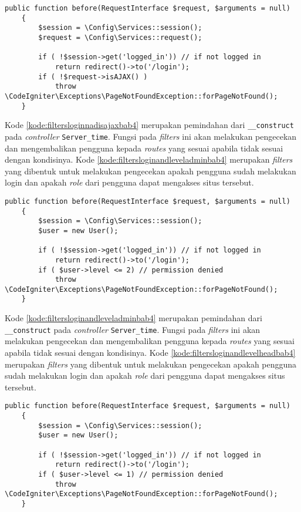 \begin{lstlisting}[caption=Pemindahan kode pada \textit{Filters}, label=kode:filtersloginnadisajaxbab4]
	public function before(RequestInterface $request, $arguments = null)
    {   
        $session = \Config\Services::session();
        $request = \Config\Services::request();

		if ( !$session->get('logged_in')) // if not logged in
			return redirect()->to('/login');
        if ( !$request->isAJAX() )
			throw \CodeIgniter\Exceptions\PageNotFoundException::forPageNotFound();
    }
\end{lstlisting}

Kode \ref{kode:filtersloginnadisajaxbab4} merupakan pemindahan dari \texttt{\_\_construct} pada \textit{controller}  \texttt{Server\_time}. Fungsi pada \textit{filters} ini akan melakukan pengecekan dan mengembalikan pengguna kepada \textit{routes} yang sesuai apabila tidak sesuai dengan kondisinya. Kode \ref{kode:filtersloginandleveladminbab4} merupakan \textit{filters} yang dibentuk untuk melakukan pengecekan apakah pengguna sudah melakukan login dan apakah \textit{role} dari pengguna dapat mengakses situs tersebut.

\begin{lstlisting}[caption=Pemindahan kode pada \textit{Filters}, label=kode:filtersloginandleveladminbab4]
	public function before(RequestInterface $request, $arguments = null)
    {   
        $session = \Config\Services::session();
        $user = new User();

		if ( !$session->get('logged_in')) // if not logged in
			return redirect()->to('/login');
        if ( $user->level <= 2) // permission denied
			throw \CodeIgniter\Exceptions\PageNotFoundException::forPageNotFound();	
    }
\end{lstlisting}

Kode \ref{kode:filtersloginandleveladminbab4} merupakan pemindahan dari \texttt{\_\_construct} pada \textit{controller}  \texttt{Server\_time}. Fungsi pada \textit{filters} ini akan melakukan pengecekan dan mengembalikan pengguna kepada \textit{routes} yang sesuai apabila tidak sesuai dengan kondisinya. Kode \ref{kode:filtersloginandlevelheadbab4} merupakan \textit{filters} yang dibentuk untuk melakukan pengecekan apakah pengguna sudah melakukan login dan apakah \textit{role} dari pengguna dapat mengakses situs tersebut.

\begin{lstlisting}[caption=Pemindahan kode pada \textit{Filters}, label=kode:filtersloginandlevelheadbab4]
	public function before(RequestInterface $request, $arguments = null)
    {   
        $session = \Config\Services::session();
        $user = new User();

		if ( !$session->get('logged_in')) // if not logged in
			return redirect()->to('/login');
        if ( $user->level <= 1) // permission denied
			throw \CodeIgniter\Exceptions\PageNotFoundException::forPageNotFound();	
    }
\end{lstlisting}

